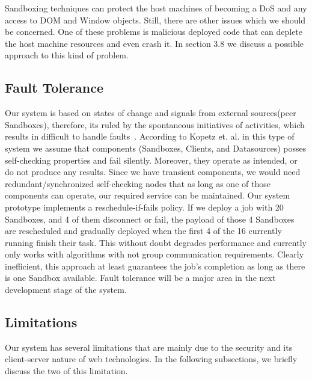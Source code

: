 \documentclass[10pt,reprint]{socc14}
\begin{document}
Sandboxing techniques can protect the host machines of becoming a DoS and any access to DOM and Window objects. Still, there are other issues which we should be concerned. One of these problems is malicious deployed code that can deplete the host machine resources and even crash it. In section 3.8 we discuss a possible approach to this kind of problem.


\subsection{Fault Tolerance}
Our system is based on states of change and signals from external sources(peer Sandboxes), therefore, its ruled by the spontaneous initiatives of activities, which results in difficult to handle faults~\cite{Kopetz1989a}. According to Kopetz et. al. in this type of system we assume that components (Sandboxes, Clients, and Datasources) posses self-checking properties and fail silently. Moreover, they operate as intended, or do not produce any results. Since we have transient components, we would need redundant/synchronized self-checking nodes that as long as one of those components can operate, our required service can be maintained. Our system prototype implements a reschedule-if-fails policy. If we deploy a job with 20 Sandboxes, and 4 of them disconnect or fail, the payload of those 4 Sandboxes are rescheduled and gradually deployed when the first 4 of the 16 currently running finish their task. This without doubt degrades performance and currently only works with algorithms with not group communication requirements. Clearly inefficient, this approach at least guarantees the job’s completion as long as there is one Sandbox available. Fault tolerance will be a major area in the next development stage of the system.


\subsection{Limitations}
Our system has several limitations that are mainly due to the security and its client-server nature of web technologies. In the following subsections, we briefly discuss the two of this limitation.
\end{document}
